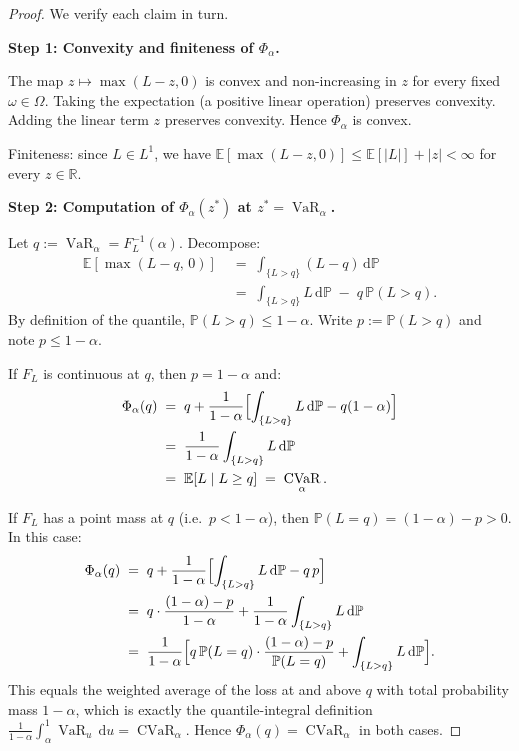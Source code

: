\documentclass[12pt,openany]{book}
\newcommand{\R}{\mathbb{R}}
\newcommand{\E}{\mathbb{E}}
\numberwithin{equation}{chapter}
\theoremstyle{plain}
\theoremstyle{definition}
\theoremstyle{remark}
\numberwithin{equation}{chapter}
\theoremstyle{plain}
\DeclareMathOperator{\CVaR}{CVaR}
\DeclareMathOperator{\VaR}{VaR}
\begin{document}
\begin{proof}
We verify each claim in turn.

\medskip
\noindent\textbf{Step 1: Convexity and finiteness of $\Phi_\alpha$.}

The map $z \mapsto \max(L - z, 0)$ is convex and non-increasing in $z$
for every fixed $\omega \in \Omega$.  Taking the expectation (a
positive linear operation) preserves convexity.  Adding the linear
term $z$ preserves convexity.  Hence $\Phi_\alpha$ is convex.

Finiteness: since $L \in L^1$, we have
$\E[\max(L-z,0)] \leq \E[|L|] + |z| < \infty$ for every $z \in \R$.

\medskip
\noindent\textbf{Step 2: Computation of $\Phi_\alpha(z^*)$ at $z^* = \VaR_\alpha$.}

Let $q := \VaR_\alpha = F_L^{-1}(\alpha)$.  Decompose:
\begin{align}
  \E[\max(L - q,\,0)]
    &\;=\; \int_{\{L > q\}} (L - q)\,\mathrm{d}\mathbb{P}
            \label{eq:decomp1}\\
    &\;=\; \int_{\{L > q\}} L\,\mathrm{d}\mathbb{P}
           \;-\; q\,\mathbb{P}(L > q).
            \label{eq:decomp2}
\end{align}
By definition of the quantile, $\mathbb{P}(L > q) \leq 1 - \alpha$.
Write $p := \mathbb{P}(L > q)$ and note $p \leq 1 - \alpha$.

If $F_L$ is continuous at $q$, then $p = 1 - \alpha$ and:
\begin{align}
  \Phi_\alpha(q)
    &\;=\; q + \frac{1}{1-\alpha}
           \Bigl[\int_{\{L > q\}} L\,\mathrm{d}\mathbb{P}
                 - q(1-\alpha)\Bigr] \label{eq:phi-cont1}\\
    &\;=\; \frac{1}{1-\alpha}\int_{\{L > q\}} L\,\mathrm{d}\mathbb{P}
            \label{eq:phi-cont2}\\
    &\;=\; \E[L \mid L \geq q]
    \;=\; \CVaR_\alpha. \label{eq:phi-cont3}
\end{align}

If $F_L$ has a point mass at $q$ (i.e.\ $p < 1-\alpha$), then
$\mathbb{P}(L = q) = (1-\alpha) - p > 0$.  In this case:
\begin{align}
  \Phi_\alpha(q)
    &\;=\; q + \frac{1}{1-\alpha}
           \Bigl[\int_{\{L > q\}} L\,\mathrm{d}\mathbb{P}
                 - q\,p\Bigr] \label{eq:phi-atom1}\\
    &\;=\; q\cdot\frac{(1-\alpha) - p}{1-\alpha}
           + \frac{1}{1-\alpha}\int_{\{L > q\}} L\,\mathrm{d}\mathbb{P}
            \label{eq:phi-atom2}\\
    &\;=\; \frac{1}{1-\alpha}
           \Bigl[q\,\mathbb{P}(L=q)\cdot\frac{(1-\alpha)-p}{\mathbb{P}(L=q)}
                 + \int_{\{L > q\}} L\,\mathrm{d}\mathbb{P}\Bigr].
            \label{eq:phi-atom3}
\end{align}
This equals the weighted average of the loss at and above $q$ with
total probability mass $1-\alpha$, which is exactly the quantile-integral
definition $\frac{1}{1-\alpha}\int_\alpha^1 \VaR_u\,\mathrm{d}u = \CVaR_\alpha$.
Hence $\Phi_\alpha(q) = \CVaR_\alpha$ in both cases.


\end{proof}
\end{document}
